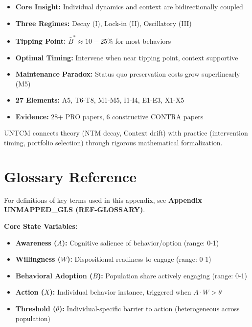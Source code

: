 \begin{itemize}[nosep]
    \item \textbf{Core Insight:} Individual dynamics and context are bidirectionally coupled
    \item \textbf{Three Regimes:} Decay (I), Lock-in (II), Oscillatory (III)
    \item \textbf{Tipping Point:} $\bar{B}^* \approx 10-25\%$ for most behaviors
    \item \textbf{Optimal Timing:} Intervene when near tipping point, context supportive
    \item \textbf{Maintenance Paradox:} Status quo preservation costs grow superlinearly (M5)
    \item \textbf{27 Elements:} A5, T6-T8, M1-M5, I1-I4, E1-E3, X1-X5
    \item \textbf{Evidence:} 28+ PRO papers, 6 constructive CONTRA papers
\end{itemize}

UNTCM connects theory (NTM decay, Context drift) with practice (intervention timing, portfolio selection) through rigorous mathematical formalization.

\section{Glossary Reference}
\label{sec:untcm-glossary}

For definitions of key terms used in this appendix, see \textbf{Appendix UNMAPPED_GLS (REF-GLOSSARY)}.

\textbf{Core State Variables:}
\begin{itemize}[nosep]
    \item \textbf{Awareness ($A$):} Cognitive salience of behavior/option (range: 0-1)
    \item \textbf{Willingness ($W$):} Dispositional readiness to engage (range: 0-1)
    \item \textbf{Behavioral Adoption ($B$):} Population share actively engaging (range: 0-1)
    \item \textbf{Action ($X$):} Individual behavior instance, triggered when $A \cdot W > \theta$
    \item \textbf{Threshold ($\theta$):} Individual-specific barrier to action (heterogeneous across population)
\end{itemize}


